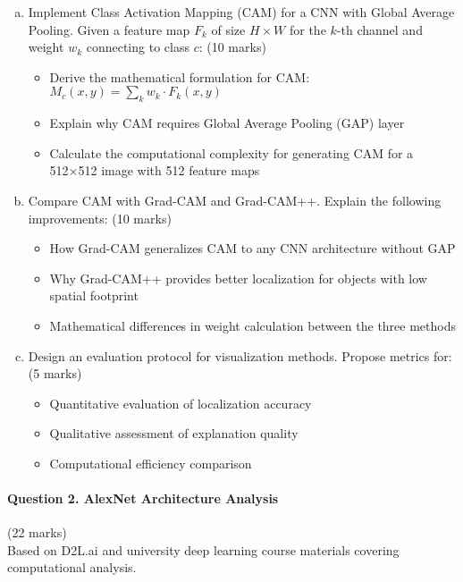 \documentclass[12pt]{article}
\newcommand{\shortanswer}{\vspace{2cm}}
\newcommand{\mediumanswer}{\vspace{3cm}}
\newcommand{\journalspace}{\vspace{4.5cm}}
\begin{document}
\begin{enumerate}[(a)]
    \item Implement Class Activation Mapping (CAM) for a CNN with Global Average Pooling. Given a feature map $F_k$ of size $H \times W$ for the $k$-th channel and weight $w_k$ connecting to class $c$: \hfill (10 marks)
    \begin{itemize}
        \item Derive the mathematical formulation for CAM: $M_c(x,y) = \sum_k w_k \cdot F_k(x,y)$
        \item Explain why CAM requires Global Average Pooling (GAP) layer
        \item Calculate the computational complexity for generating CAM for a 512×512 image with 512 feature maps
    \end{itemize}
    
    \journalspace
    
    \item Compare CAM with Grad-CAM and Grad-CAM++. Explain the following improvements: \hfill (10 marks)
    \begin{itemize}
        \item How Grad-CAM generalizes CAM to any CNN architecture without GAP
        \item Why Grad-CAM++ provides better localization for objects with low spatial footprint
        \item Mathematical differences in weight calculation between the three methods
    \end{itemize}
    
    \mediumanswer
    
    \item Design an evaluation protocol for visualization methods. Propose metrics for: \hfill (5 marks)
    \begin{itemize}
        \item Quantitative evaluation of localization accuracy
        \item Qualitative assessment of explanation quality
        \item Computational efficiency comparison
    \end{itemize}
    
    \shortanswer
\end{enumerate}

\newpage
\paragraph{Question 2. AlexNet Architecture Analysis}{\hfill (22 marks)}\\
Based on D2L.ai and university deep learning course materials covering computational analysis.
\end{document}
